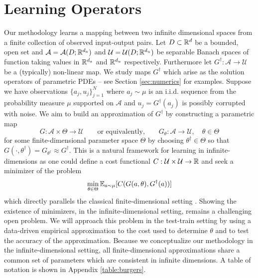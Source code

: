 \documentclass{article} %
\newcommand{\A}{\mathcal{A}}
\newcommand{\U}{\mathcal{U}}
\newcommand{\Ftrue}{G^\dagger}
\newcommand{\F}{{G}}
\begin{document}
\section{Learning Operators}
\label{sec:operator}
Our methodology learns a mapping between two infinite dimensional spaces from a finite
collection of observed input-output pairs. Let  $D \subset \mathbb{R}^d$ be a bounded, open set and \(\A = \A(D;\R^{d_a})\) and \(\U= \U(D;\R^{d_u})\) be separable Banach spaces of function taking values in \(\mathbb{R}^{d_a}\) and \(\mathbb{R}^{d_u}\) respectively. Furthermore let \(\Ftrue : \A \to \U\) be a (typically) non-linear map. We study maps \(\Ftrue\) which arise as the solution operators of parametric PDEs -- see Section \ref{sec:numerics} for examples. Suppose we have observations \(\{a_j, u_j\}_{j=1}^N\) where 
\(a_j \sim \mu\) is an i.i.d. sequence from the probability measure \(\mu\) supported on 
\(\A\) and \(u_j = \Ftrue(a_j)\) is possibly corrupted with noise. We aim to build an approximation of \(\Ftrue\) by 
constructing a parametric map 
\begin{equation}
\label{eq:approxmap}
\F : \A \times \Theta \to \U
\qquad
\text{or equivalently,}
\qquad
\F_{\theta} : \A \to \U, \quad \theta \in \Theta
\end{equation}
for some finite-dimensional parameter space \(\Theta\) by choosing
\(\theta^\dagger \in \Theta\) so that \(\F(\cdot, \theta^\dagger) = \F_{\theta^\dagger} \approx \Ftrue\).
This is a natural framework for learning in infinite-dimensions as one could define a cost functional \(C : \U \times \U \to \R\) and seek a minimizer of the problem
\[\min_{\theta \in \Theta} \E_{a \sim \mu} [C(\F(a,\theta), \Ftrue(a))]\]
which directly parallels the classical finite-dimensional 
setting \citep{Vapnik1998}. Showing the existence of minimizers, in the infinite-dimensional setting, remains a challenging open problem. We will approach this problem in the test-train setting by using a data-driven
empirical approximation to the cost used to determine
$\theta$ and to test the accuracy of the approximation.
Because we conceptualize our methodology in the infinite-dimensional setting, all finite-dimensional approximations share a common set of parameters which are consistent in infinite dimensions. 
A table of notation is shown in Appendix \ref{table:burgers}.
\end{document}
